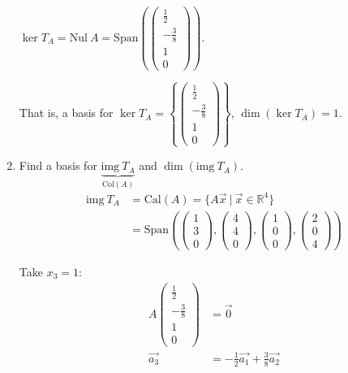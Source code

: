 \documentclass[11pt,fleqn]{book} %
\begin{document}
\begin{example}
\begin{enumerate}
        $\ker T_A = \mathrm{Nul}~A = \mathrm{Span}\left( \begin{pmatrix} \frac12 \\ -\frac38 \\ 1 \\ 0 \end{pmatrix} \right)$. 
        
        That is, a basis for $\ker T_A = \left\{ \begin{pmatrix} \frac12 \\ -\frac38 \\ 1 \\ 0 \end{pmatrix} \right\}$, $\dim\left( \ker T_A \right)=1$. 
        
        \item Find a basis for $\underbrace{\mathrm{img}~T_A}_{\mathrm{Col}(A)}$ and $\dim \left( \mathrm{img}~T_A \right)$. 
        \begin{align*}
            \mathrm{img}~T_A 
            &= \mathrm{Cal}(A) = \{ A\overrightarrow{x} ~|~ \overrightarrow{x} \in \mathbb{R}^4 \}
            \\
            &=\mathrm{Span}\left( \begin{pmatrix} 1\\3\\0 \end{pmatrix}, \begin{pmatrix} 4\\4\\0 \end{pmatrix}, \begin{pmatrix} 1\\0\\0 \end{pmatrix}, \begin{pmatrix} 2\\0\\4 \end{pmatrix} \right)
        \end{align*}
        
        Take $x_3=1$: 
        \begin{align*}
            A \begin{pmatrix} \frac12\\-\frac38\\1\\0 \end{pmatrix}
            &=\overrightarrow{0}
            \\
            \overrightarrow{a_3} 
            &= -\frac12\overrightarrow{a_1} + \frac38\overrightarrow{a_2} 
        \end{align*}
        

\end{enumerate}
\end{example}
\end{document}
